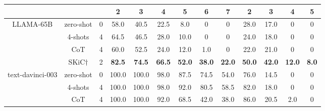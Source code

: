 \begin{table}[t]
{\begin{tabular}{c|c|c|cc|cccc||cc|cc}
 & & &\multicolumn{1}{c}{\textbf{2}} & \multicolumn{1}{c|}{\textbf{3}} & \textbf{4}   & \textbf{5}   & \textbf{6}   & \textbf{7} &\multicolumn{1}{c}{\textbf{2}} & \multicolumn{1}{c|}{\textbf{3}} & \textbf{4}   & \textbf{5} \\ \midrule \midrule
\multirow{4}{*}{LLAMA-65B} & zero-shot    &0              & 58.0                             & 40.5                             & 22.5           & 8.0            & 0            & 0            & 28.0                             & 17.0                             & 0                              & 0                              \\
                           & 4-shots  &4            & 64.5                             & 46.5                             & 28.0           & 10.0            & 0            & 0            & 24.0                             & 18.0                             & 0                              & 0                              \\
                           & CoT   &4             & 60.0                             & 52.5                             & 24.0           & 12.0           & 1.0            & 0           & 22.0                             & 21.0                             & 0                              & 0                              \\
                           & SKiC$\dag$  &2     & \textbf{82.5}                    & \textbf{74.5}                    & \textbf{66.5}  & \textbf{52.0}  & \textbf{38.0}  & \textbf{22.0}   & \textbf{50.0}                    & \textbf{42.0}                    & \textbf{12.0}                    & \textbf{8.0}                     \\   \midrule
\multirow{5}{*}{text-davinci-003}  & zero-shot  &0                & 100.0                            & 100.0                            & 98.0           & 87.5           & 74.5           & 54.0           & 76.0                             & 14.5                             & 0                              & 0                              \\
                           & 4-shots &4               & 100.0                            & 100.0                            & 98.0           & 92.0           & 80.5           & 58.5           & 82.0                             & 18.0                             & 0                              & 0                              \\
                           & CoT    &4               & 100.0                            & 100.0                            & 92.0           & 68.5           & 42.0           & 38.0            & 86.0                             & 20.5                             & 2.0                              & 0                              \\ 

\end{tabular}}
\end{table}
